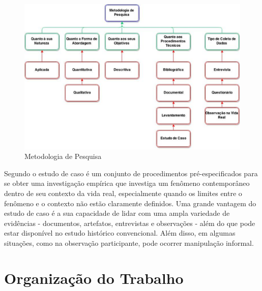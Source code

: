 \begin{figure}[h!]
\centering
\includegraphics[keepaspectratio=false,scale=0.5]{figuras/figuras_nilton/selecaoMetodologica.eps}
\caption{Metodologia de Pesquisa}
\label{7eixosqualidade}
\end{figure}

Segundo \cite{yin2001estudo} o estudo de caso é um conjunto de procedimentos pré-especificados para se obter uma investigação empírica que investiga um fenômeno contemporâneo dentro de seu contexto da vida real, especialmente quando os limites entre o fenômeno e o contexto não estão claramente definidos. Uma grande vantagem do estudo de caso é a sua capacidade de lidar com uma ampla variedade de evidências - documentos, artefatos, entrevistas e observações - além do que pode estar disponível no estudo histórico convencional. Além disso, em algumas situações, como na observação participante, pode ocorrer manipulação informal.

\section{Organização do Trabalho}
